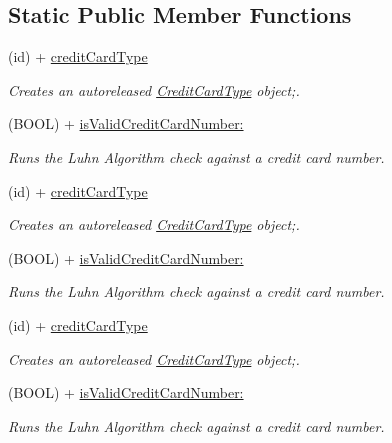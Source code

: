 \subsection*{Static Public Member Functions}
\begin{DoxyCompactItemize}
\item 
(id) + \hyperlink{interface_credit_card_type_ae1fb0f1765f7c90431810bd324e287b7}{creditCardType}
\begin{DoxyCompactList}\small\item\em Creates an autoreleased \hyperlink{interface_credit_card_type}{CreditCardType} object;. \item\end{DoxyCompactList}\item 
(BOOL) + \hyperlink{interface_credit_card_type_ab1c905ab3c19e4e3ea3301d92ae1ad30}{isValidCreditCardNumber:}
\begin{DoxyCompactList}\small\item\em Runs the Luhn Algorithm check against a credit card number. \item\end{DoxyCompactList}\item 
(id) + \hyperlink{interface_credit_card_type_ae1fb0f1765f7c90431810bd324e287b7}{creditCardType}
\begin{DoxyCompactList}\small\item\em Creates an autoreleased \hyperlink{interface_credit_card_type}{CreditCardType} object;. \item\end{DoxyCompactList}\item 
(BOOL) + \hyperlink{interface_credit_card_type_ab1c905ab3c19e4e3ea3301d92ae1ad30}{isValidCreditCardNumber:}
\begin{DoxyCompactList}\small\item\em Runs the Luhn Algorithm check against a credit card number. \item\end{DoxyCompactList}\item 
(id) + \hyperlink{interface_credit_card_type_ae1fb0f1765f7c90431810bd324e287b7}{creditCardType}
\begin{DoxyCompactList}\small\item\em Creates an autoreleased \hyperlink{interface_credit_card_type}{CreditCardType} object;. \item\end{DoxyCompactList}\item 
(BOOL) + \hyperlink{interface_credit_card_type_ab1c905ab3c19e4e3ea3301d92ae1ad30}{isValidCreditCardNumber:}
\begin{DoxyCompactList}\small\item\em Runs the Luhn Algorithm check against a credit card number. \item\end{DoxyCompactList}\end{DoxyCompactItemize}
